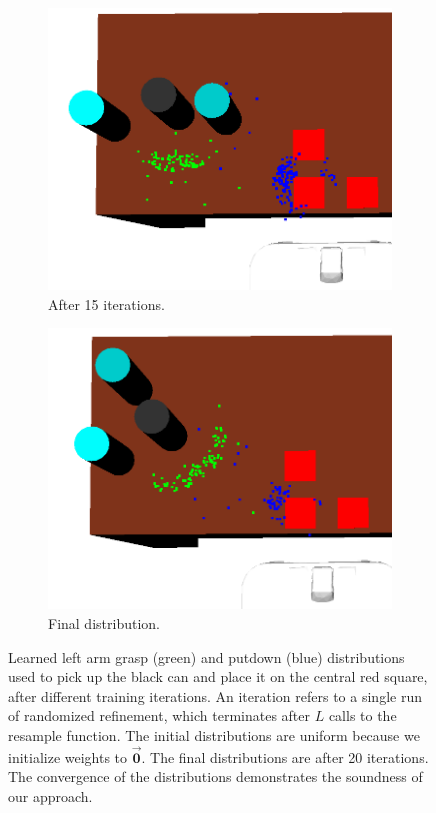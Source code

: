 \begin{figure}
\begin{subfigure}[b]{0.48\linewidth}
  \end{subfigure}
  \begin{subfigure}[b]{0.48\linewidth}
    \includegraphics[width=\textwidth]{images/learn15.png}
    \caption{After 15 iterations.}
  \end{subfigure}
  \begin{subfigure}[b]{0.48\linewidth}
    \includegraphics[width=\textwidth]{images/learn20.png}
    \caption{Final distribution.}
  \end{subfigure}
  \caption{Learned left arm grasp (green) and putdown (blue) distributions used to
pick up the black can and place it on the central red square, after different training iterations.
An iteration refers to a single run of randomized refinement,
which terminates after $L$ calls to the resample function. The
initial distributions are uniform because we initialize weights to $\vec{\mathbf{0}}$.
The final distributions are after 20 iterations. The convergence of
the distributions demonstrates the soundness of our approach.}
  \label{fig:training}
\end{figure}

